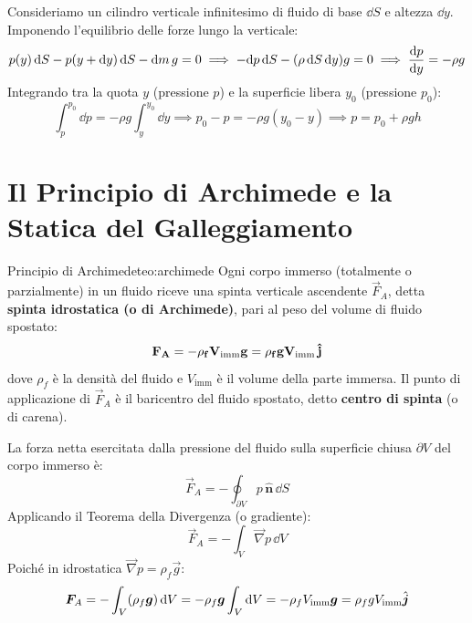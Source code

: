 \begin{dimostrazione}
Consideriamo un cilindro verticale infinitesimo di fluido di base $\dd S$ e altezza $\dd y$. Imponendo l'equilibrio delle forze lungo la verticale:
\begin{equation}
    p(y)\,\mathrm{d} S - p(y+\mathrm{d} y)\,\mathrm{d} S - \mathrm{d} m\,g = 0 \implies -\mathrm{d} p\,\mathrm{d} S - (\rho\,\mathrm{d} S\,\mathrm{d} y)g = 0 \implies \frac{\mathrm{d} p}{\mathrm{d} y} = -\rho g
\end{equation}
Integrando tra la quota $y$ (pressione $p$) e la superficie libera $y_0$ (pressione $p_0$):
\begin{equation}
    \int_{p}^{p_0} \dd p = -\rho g \int_y^{y_0} \dd y \implies p_0 - p = -\rho g (y_0 - y) \implies p = p_0 + \rho g h
\end{equation}
\end{dimostrazione}

\section{Il Principio di Archimede e la Statica del Galleggiamento}
\label{sec:principio_archimede}

\begin{teorema}{Principio di Archimede}{teo:archimede}
Ogni corpo immerso (totalmente o parzialmente) in un fluido riceve una spinta verticale ascendente $\vec{F}_A$, detta \textbf{spinta idrostatica (o di Archimede)}, pari al peso del volume di fluido spostato:
\begin{equation}
    \mathbf{\bm{F}_A = -\rho_f V_{\text{imm}}\bm{g} = \rho_f g V_{\text{imm}}\,\hat{\bm{j}}}
    \label{eq:archimede}
\end{equation}
dove $\rho_f$ è la densità del fluido e $V_{\text{imm}}$ è il volume della parte immersa. Il punto di applicazione di $\vec{F}_A$ è il baricentro del fluido spostato, detto \textbf{centro di spinta} (o di carena).
\end{teorema}

\begin{dimostrazione}
La forza netta esercitata dalla pressione del fluido sulla superficie chiusa $\partial V$ del corpo immerso è:
\begin{equation}
    \vec{F}_A = -\oint_{\partial V} p\,\hat{\bm{n}}\,\dd S
\end{equation}
Applicando il Teorema della Divergenza (o gradiente):
\begin{equation}
    \vec{F}_A = -\int_V \vec{\nabla}p\,\dd V
\end{equation}
Poiché in idrostatica $\vec{\nabla}p = \rho_f \vec{g}$:
\begin{equation}
    \bm{F}_A = -\int_V (\rho_f \bm{g})\,\mathrm{d} V = -\rho_f \bm{g} \int_V \mathrm{d} V = -\rho_f V_{\text{imm}}\bm{g} = \rho_f g V_{\text{imm}}\hat{\bm{j}}
\end{equation}
\end{dimostrazione}

